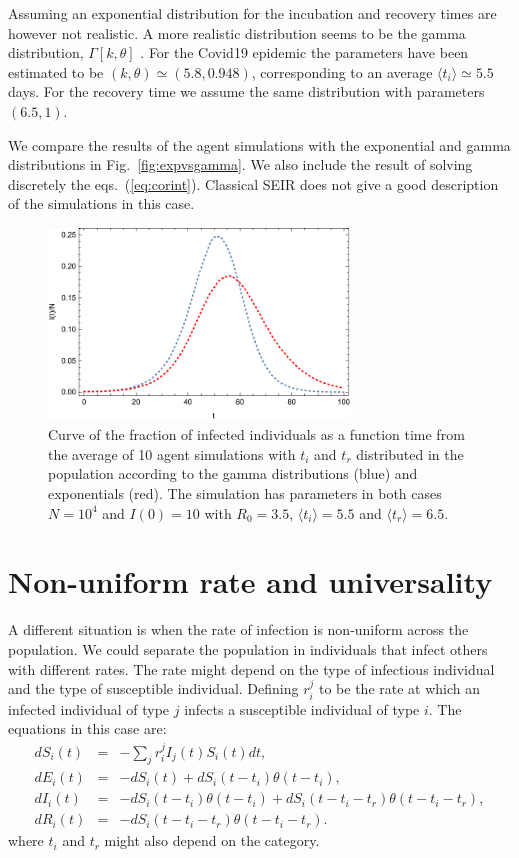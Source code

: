 \documentclass[a4paper,oneside,11pt]{article}
\begin{document}
    Assuming an exponential distribution for the incubation and recovery times are however not realistic. A more realistic distribution seems to be the  gamma distribution, $\Gamma[k,\theta]$ \cite{}. For the Covid19 epidemic the parameters have been estimated to be $(k,\theta) \simeq (5.8, 0.948)$, corresponding to an average $\langle t_i\rangle \simeq 5.5$days. For the recovery time we assume the same distribution with parameters $(6.5,1)$.

We compare the results of the agent simulations with the exponential and gamma distributions in Fig.~\ref{fig:expvsgamma}. We also include the result of solving discretely the eqs.~(\ref{eq:corint}). Classical SEIR does not give a good description of the simulations in this case. 
\begin{figure}[h!]
  \centering
  \includegraphics[width=8cm]{expvsgamma.pdf}
  \caption{ Curve of the fraction of infected individuals as a function time from the average of 10 agent simulations with $t_i$ and $t_r$ distributed in the population according to the gamma distributions (blue) and exponentials (red). The simulation has parameters in both cases $N=10^4$ and $I(0)=10$ with $R_0=3.5$, $\langle t_i\rangle=5.5$ and $\langle t_r\rangle=6.5$.  }
  \label{fig:exp}
   \end{figure}  
   
\section{Non-uniform rate and universality }

A different situation is when the rate of infection is non-uniform across the population. We could separate the population in individuals that infect others with different rates. The rate might depend on the type of infectious individual and the type of susceptible individual. Defining $r^{j}_{i}$ to be the rate at which an infected individual of type $j$ infects a susceptible individual of type $i$. The equations in this case are:
\begin{eqnarray}
d S_i(t) &=& - \sum_j r^j_{i}  I_j(t) S_i(t) dt, \nonumber\\
d E_i(t) &=& -d S_i(t) + d S_i(t-t_i) \theta(t-t_i) ,\nonumber\\
d I_i(t) &=& -d S_i(t-t_i) \theta(t-t_i)+ d S_i(t-t_i-t_r) \theta(t-t_i-t_r),\nonumber\\
d R_i(t) &=& - d S_i(t - t_i - t_r) \theta(t-t_i-t_r).\nonumber
\end{eqnarray}
where $t_i$ and $t_r$ might also depend on the category.
\end{document}
